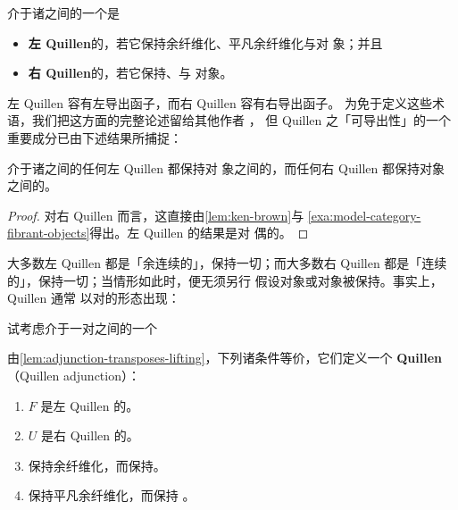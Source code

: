 \begin{definition}\label{def:quillen-functor}
介于诸\trModelCategory{}之间的一个\trFunctor{}是
\begin{itemize}
\item \textbf{左 Quillen}的，若它保持余纤维化、平凡余纤维化与\trCofibrant{}对
  象；并且
\item \textbf{右 Quillen}的，若它保持\trFibration、\trTrivialFibration{}与%
\trFibrant{}对象。
\end{itemize}
\end{definition}

左 Quillen \trFunctor{}容有左导出函子，而右 Quillen \trFunctor{}容有右导出函子。
为免于定义这些术语，我们把这方面的完整论述留给其他作者 \cite[§2.1--2]{bib103}，
但 Quillen \trFunctor{}之「可导出性」的一个重要成分已由下述结果所捕捉：

\begin{lemma}\label{lem:quillen-preserves-we}
介于诸\trModelCategory{}之间的任何左 Quillen \trFunctor{}都保持\trCofibrant{}对
象之间的\trWeakEquivalence，而任何右 Quillen \trFunctor{}都保持\trFibrant{}对象
之间的\trWeakEquivalence。
\end{lemma}
\begin{proof}
对右 Quillen \trFunctor{}而言，这直接由\cref{lem:ken-brown}与%
\cref{exa:model-category-fibrant-objects}得出。左 Quillen \trFunctor{}的结果是对
偶的。
\end{proof}

大多数左 Quillen \trFunctor{}都是「余连续的」，保持一切\trColimit；而大多数右
Quillen \trFunctor{}都是「连续的」，保持一切\trLimit；当情形如此时，便无须另行
假设\trCofibrant{}对象或\trFibrant{}对象被保持。事实上，Quillen \trFunctor{}通常
以\trAdjunction{}对的形态出现：

\begin{definition}\label{def:quillen-adjunction}
试考虑介于一对\trModelCategory{}之间的一个\trAdjunction
\begin{center}
\end{center}
由\cref{lem:adjunction-transposes-lifting}，下列诸条件等价，它们定义一个%
\textbf{Quillen \trAdjunction}（Quillen adjunction）：
\begin{enumerate}[label=(\roman*)]
\item \trLeftAdjoint{} $F$ 是左 Quillen 的。
\item \trRightAdjoint{} $U$ 是右 Quillen 的。
\item \trLeftAdjoint{}保持余纤维化，而\trRightAdjoint{}保持\trFibration。
\item \trLeftAdjoint{}保持平凡余纤维化，而\trRightAdjoint{}保持%
\trTrivialFibration。
\end{enumerate}
\end{definition}

